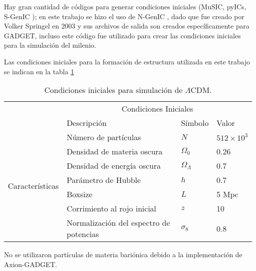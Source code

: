 \documentclass[a4paper,openright,12pt]{book}
\begin{document}
Hay gran cantidad de códigos para generar condiciones iniciales (MuSIC, pyICs, S-GenIC \cite{4.3}); en este trabajo se hizo el uso de N-GenIC \cite{3.0.3}, dado que fue creado por Volker Springel en 2003 y sus archivos de salida son creados específicamente para GADGET, incluso este código fue utilizado para crear las condiciones iniciales para la simulación del milenio.

Las condiciones iniciales para la formación de estructura utilizada en este trabajo se indican en la tabla \ref{tabla 4.1}
\begin{table}[htb]
\centering
\begin{tabular}{|l|l|l|l|}
\hline
& \multicolumn{3}{c|}{Condiciones Iniciales} \\
\cline{2-4}
& Descripción & Símbolo & Valor\\
\hline \hline
\multirow{8}{3cm}{Características} & Número de partículas & $N$ & $512\times10^{3}$\\ \cline{2-4}
& Densidad de materia oscura & $\Omega_{0} $ & 0.26\\ \cline{2-4}
& Densidad de energía oscura & $\Omega_{\Lambda}$ & 0.7\\ \cline{2-4}
& Parámetro de Hubble & $h$ & 0.7 \\ \cline{2-4}
& Boxsize & $L$ & 5 Mpc\\ \cline{2-4}
& Corrimiento al rojo inicial & $z$ & 10 \\ \cline{2-4}
& Normalización del espectro de potencias & $\sigma_{8}$ & 0.8 \\ \cline{1-4}
\end{tabular}
\caption{Condiciones iniciales para simulación de $\Lambda$CDM.}
\label{tabla 4.1}
\end{table} 
No se utilizaron partículas de materia bariónica debido a la implementación de Axion-GADGET. 
\end{document}
